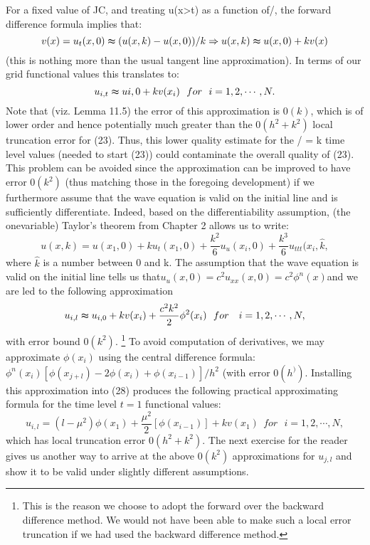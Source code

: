 \documentclass[../main.tex]{subfiles}
\begin{document}
For a fixed value of JC, and treating u(x>t) as a function of/, the forward difference 
formula implies that:
$$v(x)=u_t(x,0)\thickapprox (u(x,k)-u(x,0))/k\Rightarrow u(x,k) \thickapprox u(x,0)+kv(x)$$
(this is nothing more than the usual tangent line approximation). In terms of our 
grid functional values this translates to: 
\begin{equation}
	u_{i,t} \thickapprox u{i,0}+kv(x_i) ~~for~~i=1,2,\cdots,N.
\end{equation}
Note that (viz. Lemma 11.5) the error of this approximation is $0(k)$, which is of lower order and hence potentially much greater than the $0(h^2+k^2)$ local truncation error for (23). Thus, this lower quality estimate for the / = k time level values (needed to start (23)) could contaminate the overall quality of (23). This problem can be avoided since the approximation can be improved to have error $0(k^2)$ (thus matching those in the foregoing development) if we furthermore assume that the wave equation is valid on the initial line and is sufficiently differentiate. Indeed, based on the differentiability assumption, (the onevariable) Taylor's theorem from Chapter 2 allows us to write: 
$$
u(x,k)=u(x_1,0)+ku_t(x_1,0)+\dfrac{k^2}{6}u_u(x_i,0)+\dfrac{k^3}{6} u_{ttt}(x_i, \hat{k},
$$
where $\hat{k}$ is a number between 0 and k. The assumption that the wave equation is 
valid on the initial line tells us that$ u_u(x,0)=c^2u_{xx}(x,0)=c^2\phi^n(x) $and we are led to the following approximation
\begin{equation}
	u_{i,l}\thickapprox u_{i,0}+kv(x_i)+\dfrac{c^2k^2}{2}\phi^2(x_i) ~~for ~~~i=1,2,\cdots,N,
\end{equation}
with error bound $0(k^2)$.
\footnote{This is the reason we choose to adopt the forward over the backward difference method. We would 
not have been able to make such a local error truncation if we had used the backward difference 
method.}
To avoid computation of derivatives, we may approximate 
$\phi(x_i)$ using the central difference formula: 
$\phi^n(x_i)[\phi (x_{j+l} ) -2\phi(x_i)+\phi(x_{i-1})]/h^2$
(with error $0(h^))$. Installing this approximation into (28) produces the following practical approximating formula for the time level $t = 1$ functional values: 
\begin{equation}
	u_{i,l}=(l-\mu^2)\phi(x_1)+\dfrac{\mu^2}{2}[\phi(x_{i-1})]+kv(x_1)
	 ~~for ~~~i=1,2,\cdots,N,
\end{equation}
which has local truncation error $0(h^2+k^2)$. The next exercise for the reader gives us another way to arrive at the above $0(k^2)$ approximations for $u_{j,l}$ and show it to be valid under slightly different assumptions. 
\end{document}
